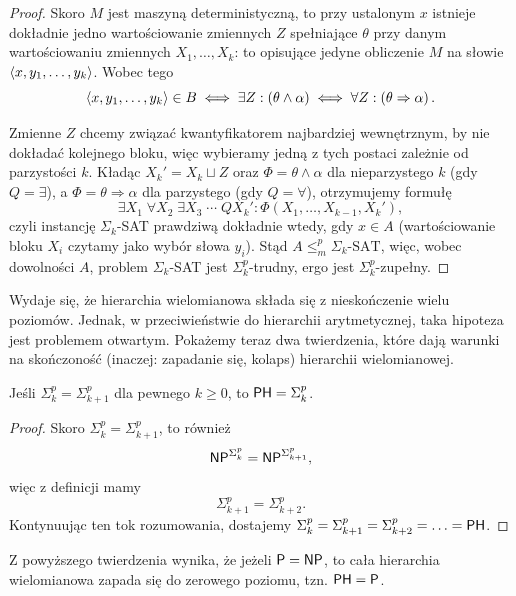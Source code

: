 \begin{proof}
    Skoro $M$ jest maszyną deterministyczną, to przy ustalonym $x$ istnieje dokładnie jedno wartościowanie zmiennych $Z$ spełniające $\theta$ przy danym wartościowaniu zmiennych $X_1, \ldots, X_k$: to opisujące jedyne obliczenie $M$ na słowie $\left\langle x, y_1, \ldots, y_k \right\rangle$. Wobec tego
    \[ \left\langle x, y_1, \ldots, y_k \right\rangle \in B \iff \exists Z : \left(\theta \land \alpha\right) \iff \forall Z : \left(\theta \Rightarrow \alpha\right). \]

    Zmienne $Z$ chcemy związać kwantyfikatorem najbardziej wewnętrznym, by nie dokładać kolejnego bloku, więc wybieramy jedną z tych postaci zależnie od parzystości $k$.
    Kładąc $X_k' = X_k \sqcup Z$ oraz $\Phi = \theta \land \alpha$ dla nieparzystego $k$ (gdy $Q = \exists$), a $\Phi = \theta \Rightarrow \alpha$ dla parzystego (gdy $Q = \forall$), otrzymujemy formułę
    \[ \exists X_1 \; \forall X_2 \; \exists X_3 \; \cdots \; Q X_k' : \Phi\left(X_1, \ldots, X_{k-1}, X_k'\right), \]
    czyli instancję $\Sigma_k$-SAT prawdziwą dokładnie wtedy, gdy $x \in A$ (wartościowanie bloku $X_i$ czytamy jako wybór słowa $y_i$).
    Stąd $A \leq_m^p \Sigma_k\text{-SAT}$, więc, wobec dowolności $A$, problem $\Sigma_k$-SAT jest $\Sigma_k^p$-trudny, ergo jest $\Sigma_k^p$-zupełny.
\end{proof}

Wydaje się, że hierarchia wielomianowa składa się z nieskończenie wielu poziomów.
Jednak, w przeciwieństwie do hierarchii arytmetycznej, taka hipoteza jest problemem otwartym.
Pokażemy teraz dwa twierdzenia, które dają warunki na skończoność (inaczej: zapadanie się, kolaps) hierarchii wielomianowej.

\begin{theorem}\label{t:PH_collapses_when_Sigma_eq_Sigma}
    Jeśli $\Sigma_k^p = \Sigma_{k+1}^p$ dla pewnego $k \geq 0$, to $\textsf{PH} = \Sigma_k^p$.
\end{theorem}
\begin{proof}
    Skoro $\Sigma_k^p = \Sigma_{k+1}^p$, to również
    \[ \textsf{NP}^{\Sigma_k^p} = \textsf{NP}^{\Sigma_{k+1}^p}, \]
    więc z definicji mamy
    \[ \Sigma_{k+1}^p = \Sigma_{k+2}^p. \]
    Kontynuując ten tok rozumowania, dostajemy $\Sigma_k^p = \Sigma_{k+1}^p = \Sigma_{k+2}^p = \ldots = \textsf{PH}$.
\end{proof}

Z powyższego twierdzenia wynika, że jeżeli $\textsf{P} = \textsf{NP}$, to cała hierarchia wielomianowa zapada się do zerowego poziomu, tzn. $\textsf{PH} = \textsf{P}$.

